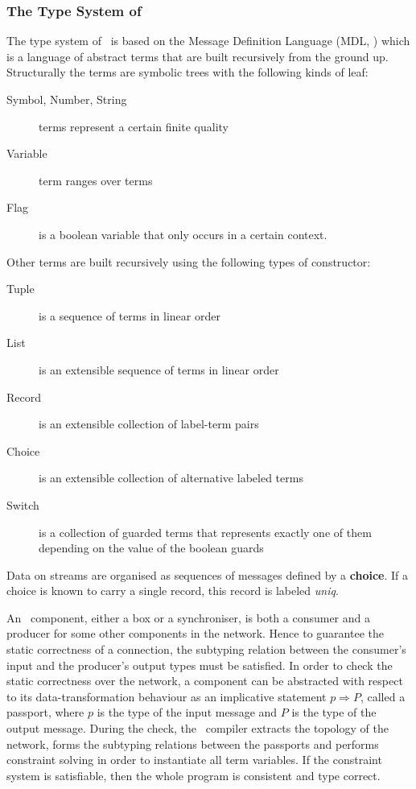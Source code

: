     \subsubsection*{The Type System of \ak\ }
The type system of \ak\ is based on the Message Definition Language (MDL, \cite{astrakahn}) which is a language of abstract terms that are built recursively from the ground up. Structurally the terms are symbolic trees with the following kinds of leaf:
\begin{description}
\item[Symbol, Number, String] terms represent a certain finite quality
\item[Variable] term ranges over terms
\item[Flag] is a boolean variable that only occurs in a certain context.
\end{description}
Other terms are built recursively using the following types of constructor:
\begin{description}
\item[Tuple] is a sequence of terms in linear order
\item[List] is an extensible sequence of terms in linear order
\item[Record] is an extensible collection of label-term pairs
\item[Choice] is an extensible collection of alternative labeled terms
\item[Switch] is a collection of guarded terms that represents exactly one of them depending on the value of the boolean guards
\end{description}

Data on streams are organised as sequences of messages defined by a \textbf{choice}. If a choice is known to carry a single record, this record is labeled \emph{uniq}.

An \ak\ component, either a box or a synchroniser, is both a consumer and a producer for some other components in the network. Hence to guarantee the static correctness of a connection, the subtyping relation between the consumer's input and the producer's output types must be satisfied. In order to check the static correctness over the network, a component can be abstracted with respect to its data-transformation behaviour as an implicative statement $p \Rightarrow P$, called a passport, where $p$ is the type of the input message and $P$ is the type of the output message. During the check, the \ak\ compiler extracts the topology of the network, forms the subtyping relations between the passports and performs constraint solving in order to instantiate all term variables. If the constraint system is satisfiable, then the whole program is consistent and type correct.


